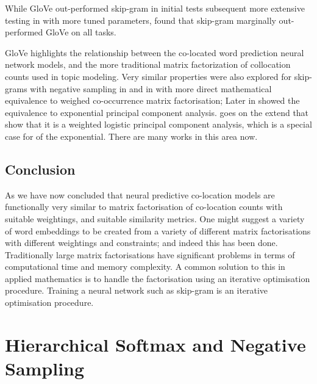\documentclass[parskip]{komatufte}
\begin{document}
While GloVe out-performed  skip-gram in initial tests subsequent more extensive testing in  with more tuned parameters,
found that skip-gram marginally out-performed GloVe on all tasks.





GloVe highlights the relationship between the co-located word prediction neural network models,
and the more traditional matrix factorization of collocation counts used in topic modeling.
Very similar properties were also explored for skip-grams with negative sampling in  and in  with more direct mathematical equivalence to weighed co-occurrence matrix factorisation;
Later in  showed the equivalence to exponential principal component analysis.
 goes on the extend that show that it is a weighted logistic principal component analysis, which is a special case for of the exponential.
There are many works in this area now.


\subsection{Conclusion}
As we have now concluded that neural predictive co-location models are functionally very similar to matrix factorisation of co-location counts with suitable weightings, and suitable similarity metrics.
One might suggest a variety of word embeddings to be created from a variety of different matrix factorisations with different weightings and constraints; and indeed this has been done.
Traditionally large matrix factorisations have significant problems in terms of computational time and memory complexity.
A common solution to this in applied mathematics is to handle the factorisation using an iterative optimisation procedure.
Training a neural network such as skip-gram is an iterative optimisation procedure.




\section{Hierarchical Softmax and Negative Sampling}\label{sec:hierachical-softmax-and-negative-sampling}
\end{document}
